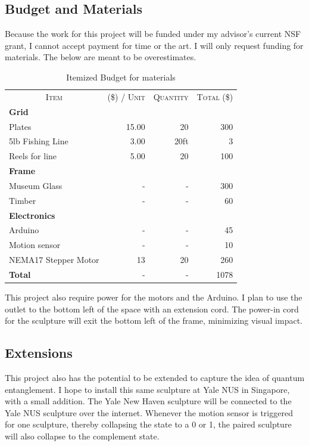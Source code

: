 \subsection{Budget and Materials}

Because the work for this project will be funded under my advisor's current NSF grant, I cannot accept payment for time or the art.
I will only request funding for materials.
The below are meant to be overestimates.

\begin{table}[h!]
\centering
\caption{Itemized Budget for materials}
\label{table:results}
\vspace{0.4em}
\begin{tabular}{|l|r|r|r|}
\hline
\multicolumn{1}{|c|}{\multirow{2}{*}{\textsc{Item}}} 
  & \multicolumn{1}{c|}{\multirow{2}{*}{\scriptsize{(\$)} \textsc{/ Unit}}}
  & \multicolumn{1}{c|}{\multirow{2}{*}{\textsc{Quantity}}}
  & \multicolumn{1}{c|}{\multirow{2}{*}{\textsc{Total} \scriptsize{(\$)}}} \\ 
& \multicolumn{1}{c|}{\textsc{}} & \multicolumn{1}{c|}{\textsc{}} & \\
\hline \hline
\textbf{Grid} & & & \\[-0.2em]
\quad Plates & 15.00 & 20 & 300  \\
\quad 5lb Fishing Line & 3.00 & 20ft & 3  \\
\quad Reels for line & 5.00 & 20 & 100  \\
\hline 
\textbf{Frame} & & & \\[-0.2em]
\quad Museum Glass & - & - & 300  \\
\quad Timber & - & - & 60  \\
\hline 
\textbf{Electronics} & & & \\[-0.2em]
\quad Arduino  & - & - & 45  \\
\quad Motion sensor & - & - & 10  \\ 
\quad NEMA17 Stepper Motor & 13 & 20 & 260  \\
\hline 
\hline 
\textbf{Total} & - & - & 1078 \\
\hline 
\end{tabular}
\end{table}

This project also require power for the motors and the Arduino. 
I plan to use the outlet to the bottom left of the space with an extension cord.
The power-in cord for the sculpture will exit the bottom left of the frame, minimizing visual impact.

\subsection{Extensions}

This project also has the potential to be extended to capture the idea of quantum entanglement.
I hope to install this same sculpture at Yale NUS in Singapore, with a small addition.
The Yale New Haven sculpture will be connected to the Yale NUS sculpture over the internet.
Whenever the motion sensor is triggered for one sculpture, thereby collapsing the state to a 0 or 1, the paired sculpture will also collapse to the complement state.


